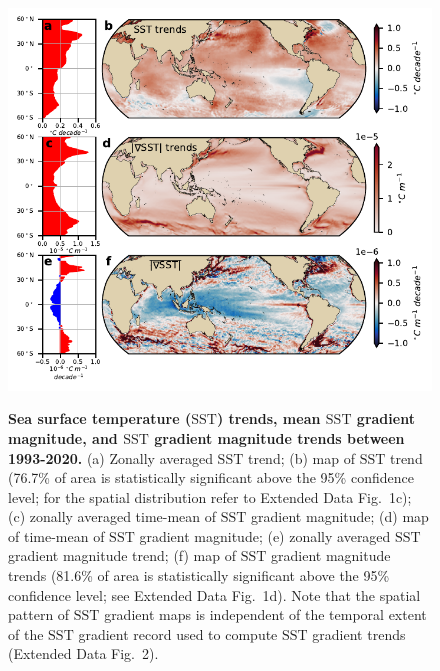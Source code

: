 \documentclass{nature}
\newcommand{\SST}{\text{SST}}
\begin{document}
\begin{figure}
    \centering
	\includegraphics[width=\textwidth]{./figures/global_SST_SST_grad_SSH_trends.pdf}\\
	\caption{\textbf{Sea surface temperature ($\SST$) trends, mean $\SST$ gradient magnitude, and $\SST$ gradient magnitude trends between 1993-2020.} (a) Zonally averaged $\SST$ trend; (b) map of $\SST$ trend (76.7\% of area is statistically significant above the 95\% confidence level; for the spatial distribution refer to Extended Data Fig.~1c); (c) zonally averaged time-mean of $\SST$ gradient magnitude; (d) map of time-mean of $\SST$ gradient magnitude; (e) zonally averaged $\SST$ gradient magnitude trend; (f) map of $\SST$ gradient magnitude trends (81.6\% of area is statistically significant above the 95\% confidence level; see Extended Data Fig.~1d). Note that the spatial pattern of $\SST$ gradient maps is independent of the temporal extent of the $\SST$ gradient record used to compute $\SST$ gradient trends (Extended Data Fig.~2). \label{fig:global_sst_ssh_trends}}
\end{figure}
\end{document}
